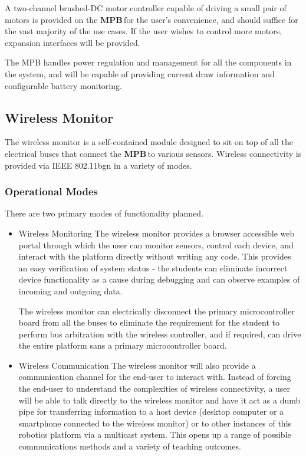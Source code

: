 \documentclass[letterpaper]{article}
\newcommand{\MPB}{\textbf{MPB}\,}
\begin{document}
A two-channel brushed-DC motor controller capable of driving a small pair of motors is provided on the \MPB for the user's convenience, and should suffice for the vast majority of the use cases. If the user wishes to control more motors, expansion interfaces will be provided.

The MPB handles power regulation and management for all the components in the system, and will be capable of providing current draw information and configurable battery monitoring.


\subsection{Wireless Monitor}
The wireless monitor is a self-contained module designed to sit on top of all the electrical buses that connect the \MPB to various sensors. Wireless connectivity is provided via IEEE 802.11b\/g\/n in a variety of modes.

\label{ss:operational-modes}
\subsubsection{Operational Modes}
There are two primary modes of functionality planned.

\begin{itemize}
\item{Wireless Monitoring}
The wireless monitor provides a browser accessible web portal through which the user can monitor sensors, control  each device, and interact with the platform directly without writing any code. This provides an easy verification of system status - the students can eliminate incorrect device functionality as a cause during debugging and can observe examples of incoming and outgoing data. 

The wireless monitor can electrically disconnect the primary microcontroller board from all the buses to eliminate the requirement for the student to perform bus arbitration with the wireless controller, and if required, can drive the entire platform sans a primary microcontroller board.


\item {Wireless Communication}
The wireless monitor will also provide a communication channel for the end-user to interact with. Instead of forcing the end-user to understand the complexities of wireless connectivity, a user will be able to talk directly to the wireless monitor and have it act as a dumb pipe for transferring information to a host device (desktop computer or a smartphone connected to the wireless monitor) or to other instances of this robotics platform via a multicast system.  This opens up a range of possible communications methods and a variety of teaching outcomes.
\end{itemize}
\end{document}
